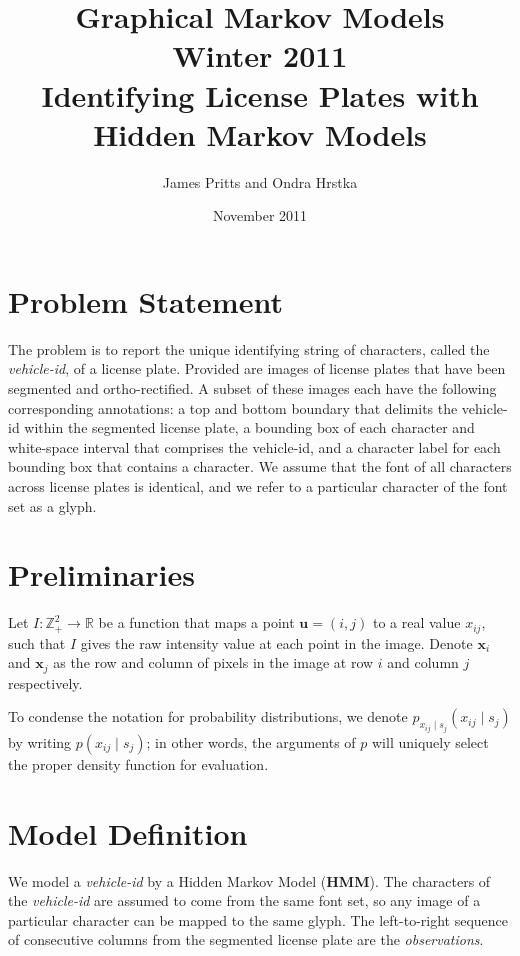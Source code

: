 \documentclass[a4paper,12pt]{article}
\title { \normalsize Graphical Markov Models \\ Winter 2011 \\
 \vspace{10mm} {\bf Identifying License Plates with Hidden Markov
    Models } }
\author{\normalsize James Pritts and Ondra Hrstka }
\date{ \small November 2011 }
\renewcommand{\ohnote}[1]{} }
\begin{document}
\maketitle

\pagestyle{empty} \ohnote{This is useful way to leave notes. Both of
  us have command tu leave notes. I have \textbackslash ohnote, you
  have \textbackslash jpnote. Notes in whole document can be disabled
  by creating file with name ``.notes\_disabled''. }

\section{Problem Statement}
The problem is to report the unique identifying string of characters,
called the \emph{vehicle-id}, of a license plate.  Provided are images
of license plates that have been segmented and ortho-rectified. A
subset of these images each have the following corresponding
annotations: a top and bottom boundary that delimits the vehicle-id
within the segmented license plate, a bounding box of each character
and white-space interval that comprises the vehicle-id, and a
character label for each bounding box that contains a character.  We
assume that the font of all characters across license plates is
identical, and we refer to a particular character of the font set as a
glyph.

\section{Preliminaries}
Let $I\colon \mathbb{Z}^2_+ \to \mathbb{R}$ be a function that maps a
point $\mathbf{u} = (i,j)$ to a real value $x_{ij}$, such that $I$
gives the raw intensity value at each point in the image.  Denote
$\mathbf{x}_i$ and $\mathbf{x}_j$ as the row and column of pixels in
the image at row $i$ and column $j$ respectively.

To condense the notation for probability distributions, we denote
$p_{x_{ij} \mid s_j}(x_{ij} \mid s_j)$ by writing $p(x_{ij} \mid
s_j)$; in other words, the arguments of $p$ will uniquely select the
proper density function for evaluation.

\section{Model Definition}
We model a \emph{vehicle-id} by a Hidden Markov Model (\textbf{HMM}).
The characters of the \emph{vehicle-id} are assumed to come from the
same font set, so any image of a particular character can be mapped to
the same glyph.  The left-to-right sequence of consecutive columns
from the segmented license plate are the \emph{observations}.
\end{document}
